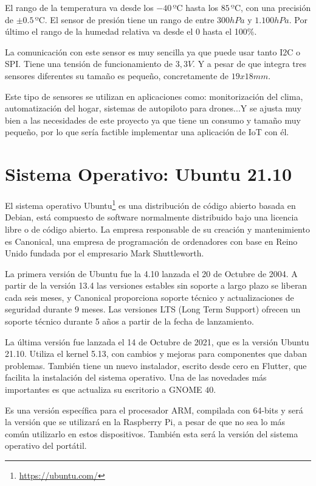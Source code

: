 \documentclass[a4paper, 12pt]{book}
\begin{document}
El rango de la temperatura va desde los $-40\, \mbox{ºC}$ hasta los $85\, \mbox{ºC}$, con una precisión de $\pm 0.5\, \mbox{ºC}$. El sensor de presión tiene un rango de entre $300 hPa$ y $1.100 hPa$. Por último el rango de la humedad relativa va desde el 0 hasta el 100\%.

La comunicación con este sensor es muy sencilla ya que puede usar tanto I2C o SPI. Tiene una tensión de funcionamiento de $3,3V$. Y a pesar de que integra tres sensores diferentes su tamaño es pequeño, concretamente de $19x18 mm$.

Este tipo de sensores se utilizan en aplicaciones como: monitorización del clima, automatización del hogar, sistemas de autopiloto para drones...Y se ajusta muy bien a las necesidades de este proyecto ya que tiene un consumo y tamaño muy pequeño, por lo que sería factible implementar una aplicación de IoT con él.


\section{Sistema Operativo: Ubuntu 21.10} 
\label{sec:sistema_operativo}

El sistema operativo Ubuntu\footnote{\url{https://ubuntu.com/}} es una distribución de código abierto basada en Debian, está compuesto de software normalmente distribuido bajo una licencia libre o de código abierto. La empresa responsable de su creación y mantenimiento es Canonical, una empresa de programación de ordenadores con base en Reino Unido fundada por el empresario Mark Shuttleworth.

La primera versión de Ubuntu fue la 4.10 lanzada el 20 de Octubre de 2004. A partir de la versión 13.4 las versiones estables sin soporte a largo plazo se liberan cada seis meses, y Canonical proporciona soporte técnico y actualizaciones de seguridad durante 9 meses. Las versiones LTS (Long Term Support) ofrecen un soporte técnico durante 5 años a partir de la fecha de lanzamiento.

La última versión fue lanzada el 14 de Octubre de 2021, que es la versión Ubuntu 21.10. Utiliza el kernel 5.13, con cambios y mejoras para componentes que daban problemas. También tiene un nuevo instalador, escrito desde cero en Flutter, que facilita la instalación del sistema operativo. Una de las novedades más importantes es que actualiza su escritorio a GNOME $40$. 

Es una versión específica para el procesador ARM, compilada con 64-bits y será la versión que se utilizará en la Raspberry Pi, a pesar de que no sea lo más común utilizarlo en estos dispositivos. También esta será la versión del sistema operativo del portátil.
\end{document}
